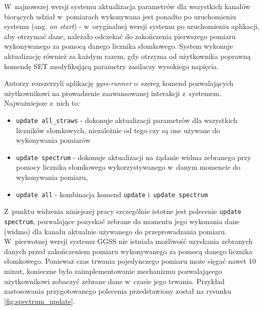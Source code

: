

W~najnowszej wersji systemu aktualizacja parametrów dla wszystkich kanałów biorących udział w~pomiarach wykonywana jest ponadto po uruchomieniu systemu (ang. \emph{on start}) - w~oryginalnej wersji systemu po uruchomieniu aplikacji, aby otrzymać dane, należało odczekać do zakończenia pierwszego pomiaru wykonywanego za pomocą danego licznika słomkowego. System wykonuje aktualizację również za każdym razem, gdy otrzyma od użytkownika poprawną komendę SET modyfikującą parametry zasilaczy wysokiego napięcia.

Autorzy rozszerzyli aplikację \emph{ggss-runner} o~szereg komend pozwalających użytkownikowi na prowadzenie zaawansowanej interakcji z~systemem. Najważniejsze z~nich to:
\begin{itemize}
\item \lstinline{update all_straws} - dokonuje aktualizacji parametrów dla wszystkich liczników słomkowych, niezależnie od tego czy są one używane do wykonywania pomiarów
\item \lstinline{update spectrum} - dokonuje aktualizacji na żądanie widma zebranego przy pomocy licznika słomkowego wykorzystywanego w~danym momencie do wykonywania pomiaru, 
\item \lstinline{update all} - kombinacja komend \lstinline{update} i~\lstinline{update spectrum}
\end{itemize}

Z~punktu widzenia niniejszej pracy szczególnie istotne jest polecenie \lstinline{update spectrum}, pozwalające pozyskać zebrane do momentu jego wykonania dane (widmo) dla kanału aktualnie używanego do przeprowadzania pomiaru. W~pierwotnej wersji systemu GGSS nie istniała możliwość uzyskania zebranych danych przed zakończeniem pomiaru wykonywanego za pomocą danego licznika słomkowego. Ponieważ czas trwania pojedynczego pomiaru może sięgać nawet 10 minut, konieczne było zaimplementowanie mechanizmu pozwalającego użytkownikowi zobaczyć zebrane dane w~czasie jego trwania. Przykład zastosowania przygotowanego polecenia przedstawiony został na rysunku \ref{fig:spectrum_update}.

